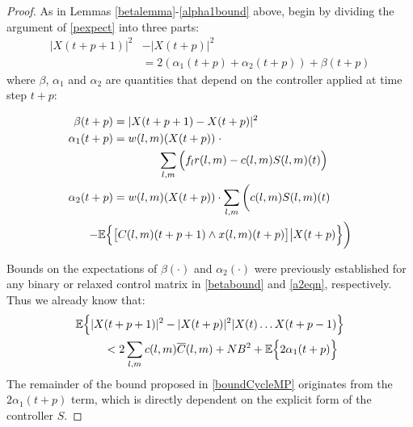 \begin{proof}
As in Lemmas \ref{betalemma}-\ref{alpha1bound} above, begin by dividing the argument of \eqref{pexpect} into three parts:
\begin{align} \label{immediate_to_bound} 
 |X(t+ p + 1)|^{2} &- |X(t + p)|^{2} \\  \nonumber
 & = 2(\alpha_1(t + p)+\alpha_2(t + p)) + \beta(t + p)   
\end{align}
where $\beta$, $\alpha_{1}$ and $\alpha_{2}$ are quantities that depend on the controller applied at time step $t + p$:
\begin{small}
\begin{align}
\beta (t+p)  &= \vert X(t + p + 1) - X(t + p) \vert^{2} \label{pbeta} \\
\alpha_{1} (t+p) &= w(l,m)(X(t + p)) \; \cdot \label{pa1} \\  \nonumber
& \qquad \qquad  \sum_{l,m} \Big(f_{l}r(l,m) - c(l,m)S(l,m)(t)\Big)\\ 
 \alpha_{2}  (t+p)&= w(l,m)(X(t + p)) \cdot \sum_{l,m} \bigg(c(l,m)S(l,m)(t) \label{pa2} \\ \nonumber
 - \expectation{ & \big[C(l,m)(t+p + 1)\wedge x(l,m)(t + p)\big] \big| X(t + p) }\bigg)
 \end{align}
 \end{small}Bounds on the expectations of  $\beta(\cdot)$ and $\alpha_2(\cdot)$ were previously established for any binary or relaxed control matrix in \eqref{betabound} and \eqref{a2eqn}, respectively. Thus we already know that:
\begin{align}\nonumber
\expectation{\vert X&(t + p + 1) \vert^2 - \vert X(t + p)\vert^2 \vert X(t) \ldots X(t + p - 1)} \\  \label{cbmpcombined1}
&< 2 \sum_{l,m} c(l,m)\overline{C}(l,m) + N B^2 + \expectation{2\alpha_1(t+p) }
\end{align}
The remainder of the bound proposed in \eqref{boundCycleMP} originates from the $2 \alpha_1 (t+p)$ term, which is directly dependent on the explicit form of the controller $S$.


\end{proof}
